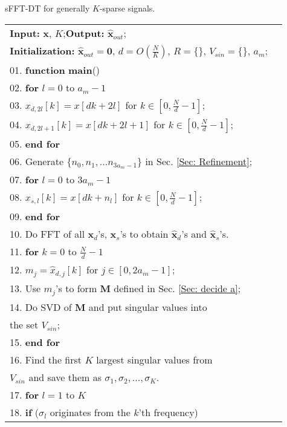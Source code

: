 \documentclass[journal,onecolumn,11pt]{IEEEtran}
\begin{document}
\begin{algorithm}[h]
\fontsize{11pt}{0.9em}\selectfont
\setlength{\abovecaptionskip}{0pt}
\setlength{\belowcaptionskip}{0pt}
\caption{sFFT-DT for generally $K$-sparse signals.}
\label{Table:our algorithm for general K-sparse signal}
\begin{tabular}[t]{p{17.7cm}l}
\textbf{Input:} $\bm{x}$, $K$;\quad \textbf{Output:} $\bm{\hat{x}}_{out}$; \\
\textbf{Initialization:} $\bm{\hat{x}}_{out}=\mathbf{0}$, $  d=O(\frac{N}{K})$, $R=\{ \}$, $V_{sin}=\{ \}$, $a_{m}$; \\
\hline\hline
01. \textbf{function} \textbf{main}()\\
02. \quad\textbf{for} $l = 0$ to $a_{m} -1$ \\
03. \quad\quad $x_{d,2l}[k]=x[dk+2l]$ for $  k\in [0,\frac{N}{d}-1]$;\\
04. \quad\quad $x_{d,2l+1}[k]=x[dk+2l+1]$ for $  k\in [0,\frac{N}{d}-1]$;\\
05. \quad\textbf{end for}\\
06. \quad Generate $\{n_{0},n_{1},...n_{3a_{m}-1} \}$ in Sec. \ref{Sec: Refinement};\\
07. \quad\textbf{for} $l = 0$ to $3a_{m} -1$ \\
08. \quad\quad $x_{s,l}[k]=x[dk+n_{l}]$ for $  k\in [0,\frac{N}{d}-1]$;\\
09. \quad\textbf{end for}\\
10. \quad Do FFT of all $\bm{x}_{d}$'s, $\bm{x}_{s}$'s to obtain $\bm{\hat{x}}_{d}$'s and $\bm{\hat{x}}_{s}$'s.\\
11. \quad \textbf{for} $k = 0$ to $  \frac{N}{d}-1$\\
12. \quad\quad \quad $m_{j}= \hat{x}_{d,j}[k]$ for $j \in [0,2a_{m}-1]$; \\
13. \quad\quad \quad Use $m_{j}$'s to form $\bm{M}$ defined in Sec. \ref{Sec: decide a}; \\
14. \quad\quad \quad Do SVD of $\bm{M}$ and put singular values into \\
\quad\quad\quad\quad \quad  the set $V_{sin}$;    \\
15. \quad \textbf{end for} \\
16. \quad Find the first $K$ largest singular values from \\
\quad\quad\quad $V_{sin}$ and save them as $\sigma_{1}, \sigma_{2},...,\sigma_{K}$.\\
17. \quad \textbf{for} $l = 1$ to $K$\\
18. \quad\quad \textbf{if} ($\sigma_{l}$ originates from the $k$'th frequency) \\

\end{tabular}
\end{algorithm}
\end{document}

